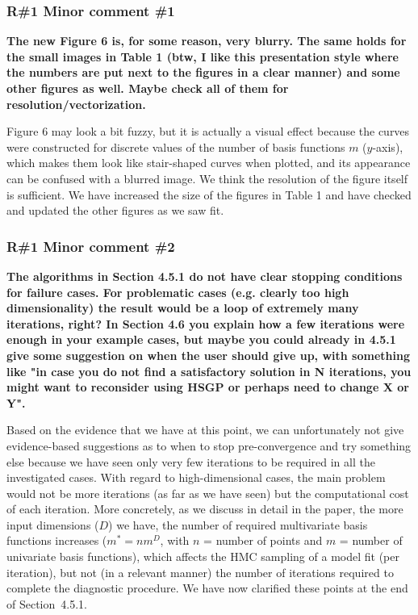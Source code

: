 \documentclass[11pt]{report}
\begin{document}
\subsubsection*{R\#1 Minor comment \#1}

\textbf{The new Figure 6 is, for some reason, very blurry. The same holds for the small images in Table 1 (btw, I like this presentation style where the numbers are put next to the figures in a clear manner) and some other figures as well. Maybe check all of them for resolution/vectorization.}

Figure 6 may look a bit fuzzy, but it is actually a visual effect because the curves were constructed for discrete values of the number of basis functions $m$ ($y$-axis), which makes them look like stair-shaped curves when plotted, and its appearance can be confused with a blurred image. We think the resolution of the figure itself is sufficient. We have increased the size of the figures in Table 1 and have checked and updated the other figures as we saw fit.



\subsubsection*{R\#1 Minor comment \#2}

\textbf{The algorithms in Section 4.5.1 do not have clear stopping conditions for failure cases.  For problematic cases (e.g. clearly too high dimensionality) the result would be a loop of  extremely many iterations, right? In Section 4.6 you explain how a few iterations were enough in your example cases, but maybe you could already in 4.5.1 give some suggestion on when the user should give up, with something like "in case you do not find a satisfactory solution in N iterations, you might want to reconsider using HSGP or perhaps need to change X or Y".}

Based on the evidence that we have at this point, we can unfortunately not give evidence-based suggestions as to when to stop pre-convergence and try something else because we have seen only very few iterations to be required in all the investigated cases. With regard to high-dimensional cases, the main problem would not be more iterations (as far as we have seen) but the computational cost of each iteration. More concretely, as we discuss in detail in the paper, the more input dimensions ($D$) we have, the number of required multivariate basis functions increases ($m^*=nm^D$, with $n$ = number of points and $m$ = number of univariate basis functions), which affects the HMC sampling of a model fit (per iteration), but not (in a relevant manner) the number of iterations required to complete the diagnostic procedure. We have now clarified these points at the end of Section~4.5.1.
\end{document}
